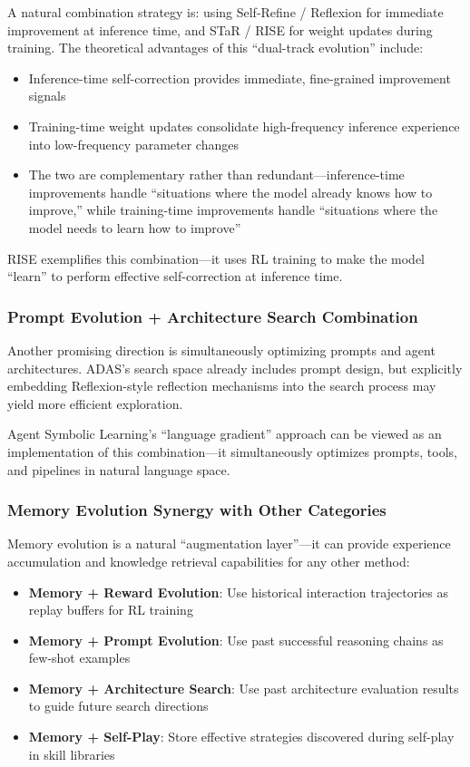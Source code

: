 A natural combination strategy is: using Self-Refine / Reflexion for immediate improvement at inference time, and STaR / RISE for weight updates during training. The theoretical advantages of this ``dual-track evolution'' include:
\begin{itemize}
\item Inference-time self-correction provides immediate, fine-grained improvement signals
\item Training-time weight updates consolidate high-frequency inference experience into low-frequency parameter changes
\item The two are complementary rather than redundant---inference-time improvements handle ``situations where the model already knows how to improve,'' while training-time improvements handle ``situations where the model needs to learn how to improve''
\end{itemize}

RISE exemplifies this combination---it uses RL training to make the model ``learn'' to perform effective self-correction at inference time.

\subsubsection{Prompt Evolution + Architecture Search Combination}

Another promising direction is simultaneously optimizing prompts and agent architectures. ADAS's search space already includes prompt design, but explicitly embedding Reflexion-style reflection mechanisms into the search process may yield more efficient exploration.

Agent Symbolic Learning's ``language gradient'' approach can be viewed as an implementation of this combination---it simultaneously optimizes prompts, tools, and pipelines in natural language space.

\subsubsection{Memory Evolution Synergy with Other Categories}

Memory evolution is a natural ``augmentation layer''---it can provide experience accumulation and knowledge retrieval capabilities for any other method:
\begin{itemize}
\item \textbf{Memory + Reward Evolution}: Use historical interaction trajectories as replay buffers for RL training
\item \textbf{Memory + Prompt Evolution}: Use past successful reasoning chains as few-shot examples
\item \textbf{Memory + Architecture Search}: Use past architecture evaluation results to guide future search directions
\item \textbf{Memory + Self-Play}: Store effective strategies discovered during self-play in skill libraries
\end{itemize}

